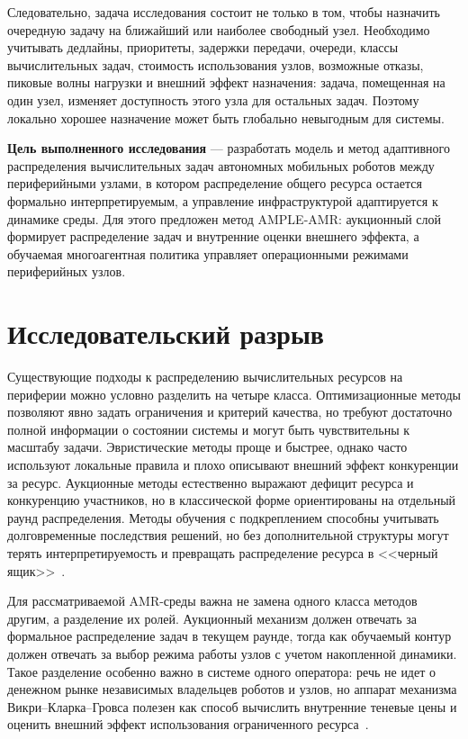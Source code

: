 \documentclass[a4paper,14pt]{extarticle}
\newcommand{\methodname}{AMPLE-AMR}
\begin{document}
Следовательно, задача исследования состоит не только в том, чтобы назначить очередную задачу на ближайший или наиболее свободный узел. Необходимо учитывать дедлайны, приоритеты, задержки передачи, очереди, классы вычислительных задач, стоимость использования узлов, возможные отказы, пиковые волны нагрузки и внешний эффект назначения: задача, помещенная на один узел, изменяет доступность этого узла для остальных задач. Поэтому локально хорошее назначение может быть глобально невыгодным для системы.

\textbf{Цель выполненного исследования} --- разработать модель и метод адаптивного распределения вычислительных задач автономных мобильных роботов между периферийными узлами, в котором распределение общего ресурса остается формально интерпретируемым, а управление инфраструктурой адаптируется к динамике среды. Для этого предложен метод \methodname{}: аукционный слой формирует распределение задач и внутренние оценки внешнего эффекта, а обучаемая многоагентная политика управляет операционными режимами периферийных узлов.

\section{Исследовательский разрыв}

Существующие подходы к распределению вычислительных ресурсов на периферии можно условно разделить на четыре класса. Оптимизационные методы позволяют явно задать ограничения и критерий качества, но требуют достаточно полной информации о состоянии системы и могут быть чувствительны к масштабу задачи. Эвристические методы проще и быстрее, однако часто используют локальные правила и плохо описывают внешний эффект конкуренции за ресурс. Аукционные методы естественно выражают дефицит ресурса и конкуренцию участников, но в классической форме ориентированы на отдельный раунд распределения. Методы обучения с подкреплением способны учитывать долговременные последствия решений, но без дополнительной структуры могут терять интерпретируемость и превращать распределение ресурса в <<черный ящик>>~\cite{Luo2021ResourceScheduling,Djigal2022MLMECSurvey,Hortelano2023RLOffloadingSurvey,Peng2024DRLOffloadingSurvey,Qiu2022AuctionEdgeSurvey,Zhang2021MARLSurvey,Oroojlooy2023CoopReview,Ning2024MARLSurvey}.

Для рассматриваемой AMR-среды важна не замена одного класса методов другим, а разделение их ролей. Аукционный механизм должен отвечать за формальное распределение задач в текущем раунде, тогда как обучаемый контур должен отвечать за выбор режима работы узлов с учетом накопленной динамики. Такое разделение особенно важно в системе одного оператора: речь не идет о денежном рынке независимых владельцев роботов и узлов, но аппарат механизма Викри--Кларка--Гровса полезен как способ вычислить внутренние теневые цены и оценить внешний эффект использования ограниченного ресурса~\cite{Vickrey1961Counterspeculation,Clarke1971MultipartPricing,Groves1973IncentivesTeams,Qiu2022AuctionEdgeSurvey}.
\end{document}
